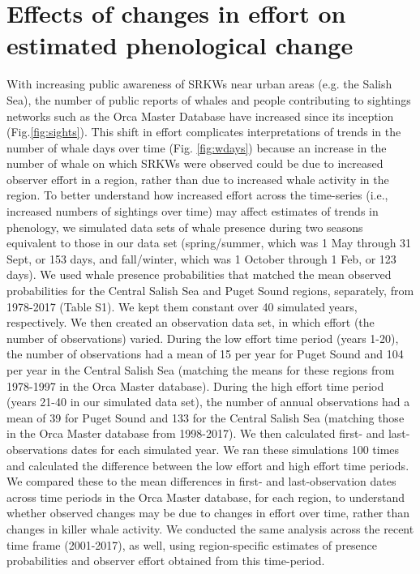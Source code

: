 \documentclass{article}
\begin{document}
\section* {Effects of changes in effort on estimated phenological change}
With increasing public awareness of SRKWs near urban areas (e.g. the Salish Sea), the number of public reports of whales and people contributing to sightings networks such as the Orca Master Database have increased since its inception (Fig.\ref{fig:sights}). This shift in effort complicates interpretations of trends in the number of whale days over time (Fig. \ref{fig:wdays}) because an increase in the number of whale on which SRKWs were observed could be due to increased observer effort in a region, rather than due to increased whale activity in the region. To better understand how increased effort across the time-series (i.e., increased numbers of sightings over time) may affect estimates of trends in phenology, we simulated data sets of whale presence during two seasons equivalent to those in our data set (spring/summer, which was 1 May through 31 Sept, or 153 days, and fall/winter, which was 1 October through 1 Feb, or 123 days). We used whale presence probabilities that matched the mean observed probabilities for the Central Salish Sea and Puget Sound regions, separately, from 1978-2017 (Table S1). We kept them constant over 40 simulated years, respectively. We then created an observation data set, in which effort (the number of observations) varied. During the low effort time period (years 1-20), the number of observations had a mean of 15 per year for Puget Sound and 104 per year in the Central Salish Sea (matching the means for these regions from 1978-1997 in the Orca Master database). During the high effort time period (years 21-40 in our simulated data set), the number of annual observations had a mean of 39 for Puget Sound and 133 for the Central Salish Sea (matching those in the Orca Master database from 1998-2017). We then calculated first- and last- observations dates for each simulated year. We ran these simulations 100 times and calculated the difference between the low effort and high effort time periods. We compared these to the mean differences in first- and last-observation dates across time periods in the Orca Master database, for each region, to understand whether observed changes may be due to changes in effort over time, rather than changes in killer whale activity. We conducted the same analysis across the recent time frame (2001-2017), as well, using region-specific estimates of presence probabilities and observer effort obtained from this time-period.
\end{document}

